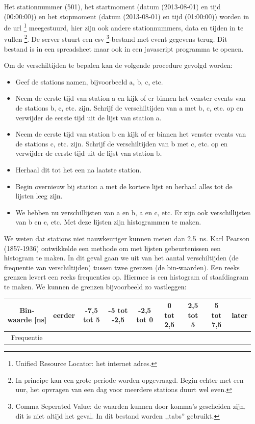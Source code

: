 Het stationnummer (501), het startmoment (datum (2013-08-01) en tijd
(00:00:00)) en het stopmoment (datum (2013-08-01) en tijd (01:00:00))
worden in de url%
\footnote{Unified Resource Locator: het internet adres.%
} meegestuurd, hier zijn ook andere stationnummers, data en tijden
in te vullen%
\footnote{In principe kan een grote periode worden opgevraagd. Begin echter
met een uur, het opvragen van een dag voor meerdere stations duurt
wel even.%
}. De server stuurt een csv%
\footnote{Comma Seperated Value: de waarden kunnen door komma's gescheiden zijn,
dit is niet altijd het geval. In dit bestand worden ,,tabs'' gebruikt.%
}-bestand met event gegevens terug. Dit bestand is in een spreadsheet
maar ook in een javascript programma te openen. 

Om de verschiltijden te bepalen kan de volgende procedure gevolgd
worden:
\begin{itemize}
\item Geef de stations namen, bijvoorbeeld a, b, c, etc.
\item Neem de eerste tijd van station a en kijk of er binnen het venster
events van de stations b, c, etc. zijn. Schrijf de verschiltijden
van a met b, c, etc. op en verwijder de eerste tijd uit de lijst van
station a.
\item Neem de eerste tijd van station b en kijk of er binnen het venster
events van de stations c, etc. zijn. Schrijf de verschiltijden van
b met c, etc. op en verwijder de eerste tijd uit de lijst van station
b.
\item Herhaal dit tot het een na laatste station.
\item Begin overnieuw bij station a met de kortere lijst en herhaal alles
tot de lijsten leeg zijn.
\item We hebben nu verschillijsten van a en b, a en c, etc. Er zijn ook
verschillijsten van b en c, etc. Met deze lijsten zijn histogrammen
te maken. 
\end{itemize}
We weten dat stations niet nauwkeuriger kunnen meten dan
\SI{2,5}{\nano\second}. Karl Pearson (1857-1936) \cite{wiki} ontwikkelde
een methode om met lijsten gebeurtenissen een histogram te maken. In dit
geval gaan we uit van het aantal verschiltijden (de frequentie van
verschiltijden) tussen twee grenzen (de bin-waarden). Een reeks grenzen
levert een reeks frequenties op. Hiermee is een histogram of
staafdiagram te maken. We kunnen de grenzen bijvoorbeeld zo vastleggen:

\bigskip{}
\begin{tabular}{|c|c|c|c|c|c|c|c|c|}
\hline 
Bin-waarde {[}ns{]} & eerder & -7,5 tot 5 & -5 tot -2,5 & -2,5 tot 0 & 0 tot 2,5 & 2,5 tot 5 & 5 tot 7,5 & later\tabularnewline
\hline 
Frequentie &  &  &  &  &  &  &  & \tabularnewline
\hline 
\end{tabular}

